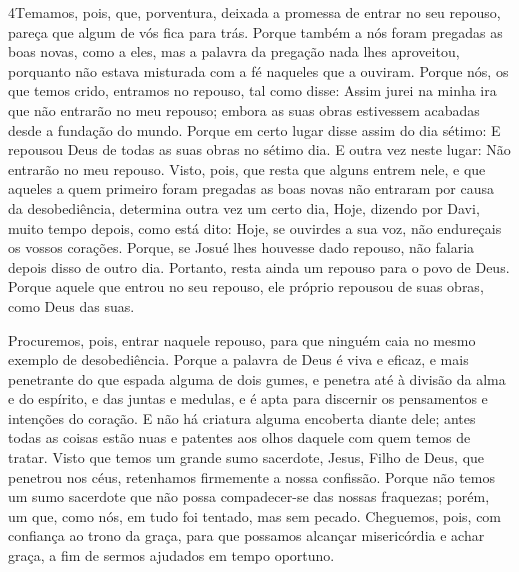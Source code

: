 \medskip

\lettrine{4} Temamos, pois, que, porventura, deixada a
promessa de entrar no seu repouso, pareça que algum de vós fica para
trás. Porque também a nós foram pregadas as boas novas, como a
eles, mas a palavra da pregação nada lhes aproveitou, porquanto não
estava misturada com a fé naqueles que a ouviram. Porque nós, os
que temos crido, entramos no repouso, tal como disse: Assim jurei na
minha ira que não entrarão no meu repouso; embora as suas obras
estivessem acabadas desde a fundação do mundo. Porque em certo
lugar disse assim do dia sétimo: E repousou Deus de todas as suas
obras no sétimo dia. E outra vez neste lugar: Não entrarão no
meu repouso. Visto, pois, que resta que alguns entrem nele, e
que aqueles a quem primeiro foram pregadas as boas novas não
entraram por causa da desobediência, determina outra vez um
certo dia, Hoje, dizendo por Davi, muito tempo depois, como está
dito: Hoje, se ouvirdes a sua voz, não endureçais os vossos
corações. Porque, se Josué lhes houvesse dado repouso, não
falaria depois disso de outro dia. Portanto, resta ainda um
repouso para o povo de Deus. Porque aquele que entrou no seu
repouso, ele próprio repousou de suas obras, como Deus das suas.

Procuremos, pois, entrar naquele repouso, para que ninguém caia
no mesmo exemplo de desobediência. Porque a palavra de Deus é
viva e eficaz, e mais penetrante do que espada alguma de dois gumes,
e penetra até à divisão da alma e do espírito, e das juntas e
medulas, e é apta para discernir os pensamentos e intenções do
coração. E não há criatura alguma encoberta diante dele;
antes todas as coisas estão nuas e patentes aos olhos daquele com
quem temos de tratar. Visto que temos um grande sumo
sacerdote, Jesus, Filho de Deus, que penetrou nos céus, retenhamos
firmemente a nossa confissão. Porque não temos um sumo
sacerdote que não possa compadecer-se das nossas fraquezas; porém,
um que, como nós, em tudo foi tentado, mas sem pecado.
Cheguemos, pois, com confiança ao trono da graça, para que
possamos alcançar misericórdia e achar graça, a fim de sermos
ajudados em tempo oportuno.

\medskip

